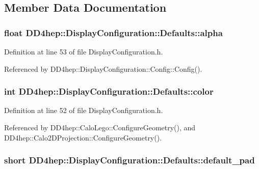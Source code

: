 \subsection{Member Data Documentation}
\hypertarget{struct_d_d4hep_1_1_display_configuration_1_1_defaults_ac0ef410d85c5a9695d6d6f595b6bd085}{
\subsubsection[{alpha}]{\setlength{\rightskip}{0pt plus 5cm}float {\bf DD4hep::DisplayConfiguration::Defaults::alpha}}}
\label{struct_d_d4hep_1_1_display_configuration_1_1_defaults_ac0ef410d85c5a9695d6d6f595b6bd085}


Definition at line 53 of file DisplayConfiguration.h.

Referenced by DD4hep::DisplayConfiguration::Config::Config().\hypertarget{struct_d_d4hep_1_1_display_configuration_1_1_defaults_a0bf12d67de25954afafe95ab865c624b}{
\subsubsection[{color}]{\setlength{\rightskip}{0pt plus 5cm}int {\bf DD4hep::DisplayConfiguration::Defaults::color}}}
\label{struct_d_d4hep_1_1_display_configuration_1_1_defaults_a0bf12d67de25954afafe95ab865c624b}


Definition at line 52 of file DisplayConfiguration.h.

Referenced by DD4hep::CaloLego::ConfigureGeometry(), and DD4hep::Calo2DProjection::ConfigureGeometry().\hypertarget{struct_d_d4hep_1_1_display_configuration_1_1_defaults_a3c5fed67372178924ac8af2555704f4b}{
\subsubsection[{default\_\-pad}]{\setlength{\rightskip}{0pt plus 5cm}short {\bf DD4hep::DisplayConfiguration::Defaults::default\_\-pad}}}
\label{struct_d_d4hep_1_1_display_configuration_1_1_defaults_a3c5fed67372178924ac8af2555704f4b}


